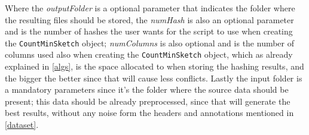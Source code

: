 \documentclass[shortpaper]{revdetua}
\begin{document}
Where the \textit{outputFolder} is a optional parameter that indicates the folder where the resulting files should be stored, the \textit{numHash} is also an optional parameter and is the number of hashes the user wants for the script to use when creating the \texttt{CountMinSketch} object; \textit{numColumns} is also optional and is the number of columns used also when creating the \texttt{CountMinSketch} object, which as already explained in \ref{algs}, is the space allocated to when storing the hashing results, and the bigger the better since that will cause less conflicts. Lastly the input folder is a mandatory parameters since it's the folder where the source data should be present; this data should be already preprocessed, since that will generate the best results, without any noise form the headers and annotations mentioned in \ref{dataset}.
\end{document}
